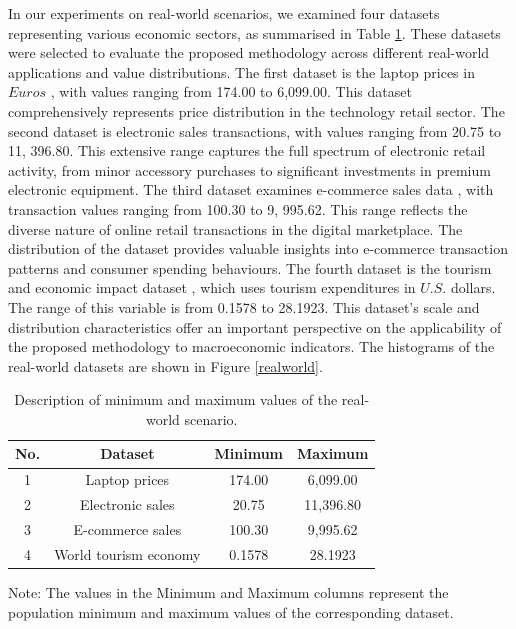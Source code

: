 \documentclass[a4paper,fleqn]{cas-dc}
\begin{document}
In our experiments on real-world scenarios, we examined four datasets representing various 
economic sectors, as summarised in Table  \ref{tab:real-params}. These datasets were selected to 
evaluate the proposed methodology across different real-world applications and value distributions. The first dataset is 
the laptop prices in $Euros$ \cite{realworld:laptop}, with values ranging from 174.00 to 6,099.00. This 
dataset comprehensively represents price distribution in the technology retail sector. The second dataset 
is electronic sales transactions\cite{realworld:elec_sales}, with values ranging from
20.75 to 11, 396.80. This extensive range captures the full spectrum of electronic retail activity, from 
minor accessory purchases to significant investments in premium electronic equipment. The third dataset 
examines e-commerce sales data \cite{realworld:ecom}, with transaction values ranging from
100.30 to 9, 995.62. This range reflects the diverse nature of online retail transactions in the digital 
marketplace. The distribution of the dataset provides valuable insights into e-commerce transaction 
patterns and consumer spending behaviours. The fourth dataset is the tourism and economic impact dataset 
\cite{realworld:tourism}, which uses tourism expenditures in $U.S.$ dollars. The range of this 
variable is from 0.1578 to 28.1923. This dataset's scale and distribution characteristics offer an 
important perspective on the applicability of the proposed
 methodology to macroeconomic indicators. The 
histograms of the real-world datasets are shown in Figure \ref{realworld}.

\begin{table}[htbp]
    \centering
    \caption{Description of minimum and maximum values of the real-world scenario.}
    \label{tab:real-params}
    \begin{threeparttable}
    \begin{tabular}{cccc}
        \toprule
        \textbf{No.} & \textbf{Dataset} & \textbf{Minimum} & \textbf{Maximum} \\
        \midrule
        1 & Laptop prices & 174.00 & 6,099.00 \\
        \midrule
         2 & Electronic sales & 20.75 & 11,396.80 \\
         \midrule
         3 & E-commerce sales & 100.30 & 9,995.62 \\
         \midrule
         4 & World tourism economy & 0.1578 & 28.1923 \\
        \bottomrule
    \end{tabular}
    \begin{tablenotes}
          \scriptsize
          \item Note: The values in the Minimum and Maximum columns represent the population minimum and maximum values of the corresponding dataset.
    \end{tablenotes}
    \end{threeparttable}
\end{table}
\end{document}

